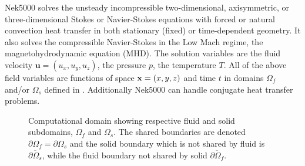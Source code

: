 \documentclass[letterpaper,10pt,english]{sphinxmanual}
\begin{document}
Nek5000 solves the unsteady incompressible two-dimensional, axisymmetric, or three-dimensional
Stokes or Navier-Stokes equations with forced or natural convection heat transfer in both
stationary (fixed) or time-dependent geometry. It also solves the compressible Navier-Stokes in the
Low Mach regime, the magnetohydrodynamic equation (MHD).  The solution variables are the fluid
velocity \(\mathbf u=(u_{x},u_{y},u_{z})\), the pressure \(p\), the temperature \(T\).
All of the above field variables are functions of space \({\bf x}=(x,y,z)\) and time \(t\)
in domains \(\Omega_f\) and/or \(\Omega_s\) defined in .
Additionally Nek5000 can handle conjugate heat transfer problems.

\begin{figure}[htbp]
\centering
\capstart

\noindent{}
\caption{Computational domain showing respective fluid and solid subdomains, \(\Omega_f\) and
\(\Omega_s\).  The shared boundaries are denoted \(\partial\Omega_f=\partial\Omega_s\)
and the solid boundary which is not shared by fluid is \(\overline{\partial\Omega_s}\),
while the fluid boundary not shared by solid \(\overline{\partial\Omega_f}\).}\label{\detokenize{theory:fig-walls}}\label{\detokenize{theory:id6}}\end{figure}
\end{document}

